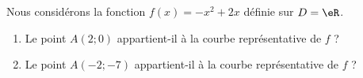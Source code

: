
\begin{exercice}\label{exoSeconde-0043}

  Nous considérons la fonction $f(x)=-x^2+2x$ définie sur \( D=\eR\).
  \begin{enumerate}
      \item
        Le point $A(2;0)$ appartient-il à la courbe représentative de \( f\)  ?
        
  \item
        Le point $A(-2;-7)$ appartient-il à la courbe représentative de \( f\)  ?
  \end{enumerate}

\end{exercice}
